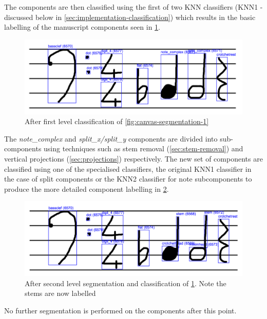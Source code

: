 The components are then classified using the first of two KNN classifiers (KNN1 - discussed below in \cref{sec:implementation-classification}) which results in the basic labelling of the manuscript components seen in \cref{fig:canvas-classified-1}.

\begin{figure}[hbt]
  \includegraphics[width=\linewidth]{gfx/techniques/labelling/initial-classification.png}
  \caption{After first level classification of \cref{fig:canvas-segmentation-1}}
  \label{fig:canvas-classified-1}
\end{figure}

The \emph{note\_complex} and \emph{split\_x/split\_y} components are divided into sub-components using techniques such as stem removal (\cref{sec:stem-removal}) and vertical projections (\cref{sec:projections}) respectively. The new set of components are classified using one of the specialised classifiers, the original KNN1 classifier in the case of split components or the KNN2 classifier for note subcomponents to produce the more detailed component labelling in \cref{fig:canvas-segmentation-classification-2}.

\begin{figure}[hbt]
  \includegraphics[width=\linewidth]{gfx/techniques/labelling/secondary-segmentation-classification.png}
  \caption{After second level segmentation and classification of \cref{fig:canvas-classified-1}. Note the stems are now labelled}
  \label{fig:canvas-segmentation-classification-2}
\end{figure}

No further segmentation is performed on the components after this point.

